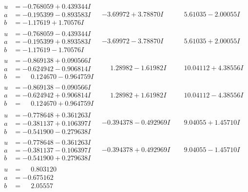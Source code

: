 \documentclass[1p]{elsarticle_modified}
\theoremstyle{definition}
\begin{document}
$$\begin{array}{c|c|c}
\begin{aligned}
u &= -0.768059 + 0.439344 I \\
a &= -0.195399 - 0.893583 I \\
b &= -1.17619 + 1.70576 I\end{aligned}
 & -3.69972 + 3.78870 I & \phantom{-}5.61035 - 2.00055 I \\ \hline\begin{aligned}
u &= -0.768059 - 0.439344 I \\
a &= -0.195399 + 0.893583 I \\
b &= -1.17619 - 1.70576 I\end{aligned}
 & -3.69972 - 3.78870 I & \phantom{-}5.61035 + 2.00055 I \\ \hline\begin{aligned}
u &= -0.869138 + 0.090566 I \\
a &= -0.624942 - 0.906814 I \\
b &= \phantom{-}0.124670 - 0.964759 I\end{aligned}
 & \phantom{-}1.28982 - 1.61982 I & \phantom{-}10.04112 + 4.38556 I \\ \hline\begin{aligned}
u &= -0.869138 - 0.090566 I \\
a &= -0.624942 + 0.906814 I \\
b &= \phantom{-}0.124670 + 0.964759 I\end{aligned}
 & \phantom{-}1.28982 + 1.61982 I & \phantom{-}10.04112 - 4.38556 I \\ \hline\begin{aligned}
u &= -0.778648 + 0.361263 I \\
a &= -0.381137 + 0.106397 I \\
b &= -0.541900 - 0.279638 I\end{aligned}
 & -0.394378 - 0.492969 I & \phantom{-}9.04055 + 1.45710 I \\ \hline\begin{aligned}
u &= -0.778648 - 0.361263 I \\
a &= -0.381137 - 0.106397 I \\
b &= -0.541900 + 0.279638 I\end{aligned}
 & -0.394378 + 0.492969 I & \phantom{-}9.04055 - 1.45710 I \\ \hline\begin{aligned}
u &= \phantom{-}0.803120\phantom{ +0.000000I} \\
a &= -0.675162\phantom{ +0.000000I} \\
b &= \phantom{-}2.05557\phantom{ +0.000000I}\end{aligned}

\end{array}$$
\end{document}

